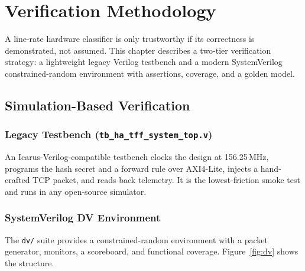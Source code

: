 \documentclass[12pt,twoside,openright]{book}
\begin{document}
\chapter{Verification Methodology}
\label{chap:verification}

A line-rate hardware classifier is only trustworthy if its correctness is demonstrated, not assumed.
This chapter describes a two-tier verification strategy: a lightweight legacy Verilog testbench and
a modern SystemVerilog constrained-random environment with assertions, coverage, and a golden
model.

\section{Simulation-Based Verification}

\subsection{Legacy Testbench (\texttt{tb\_ha\_tff\_system\_top.v})}

An Icarus-Verilog-compatible testbench clocks the design at 156.25\,MHz, programs the hash secret
and a forward rule over AXI4-Lite, injects a hand-crafted TCP packet, and reads back telemetry. It
is the lowest-friction smoke test and runs in any open-source simulator.

\subsection{SystemVerilog DV Environment}

The \texttt{dv/} suite provides a constrained-random environment with a packet generator, monitors,
a scoreboard, and functional coverage. Figure~\ref{fig:dv} shows the structure.
\end{document}

